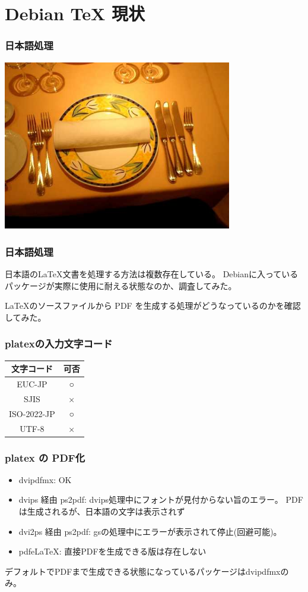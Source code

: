 \documentclass[cjk,dvipdfmx]{beamer}
\begin{document}
\section{Debian TeX 現状}

\begin{frame}
\frametitle{日本語処理}

\includegraphics[width=10cm]{image200604/appetite.png}

\end{frame}

\begin{frame}
\frametitle{日本語処理}

日本語の\LaTeX 文書を処理する方法は複数存在している。
Debianに入っているパッケージが実際に使用に耐える状態なのか、調査してみた。

\LaTeX のソースファイルから PDF を生成する処理がどうなっているのかを確認
してみた。

\end{frame}

\begin{frame}
\frametitle{platexの入力文字コード}
\begin{center}
 \begin{tabular}{|c|c|}
 文字コード & 可否 \\
 \hline
 EUC-JP & ○ \\
 SJIS & × \\
 ISO-2022-JP & ○ \\
 UTF-8 & × \\
 \end{tabular}
\end{center}

\end{frame}

\begin{frame}
\frametitle{platex の PDF化}
\begin{itemize}
 \item dvipdfmx: OK
 \item dvips 経由 ps2pdf: dvips処理中にフォントが見付からない旨のエラー。
       PDFは生成されるが、日本語の文字は表示されず
 \item dvi2ps 経由 ps2pdf: gsの処理中にエラーが表示されて停止(回避可能)。
 \item pdfe\LaTeX: 直接PDFを生成できる版は存在しない
\end{itemize}
デフォルトでPDFまで生成できる状態になっているパッケージはdvipdfmxのみ。
\end{frame}
\end{document}
